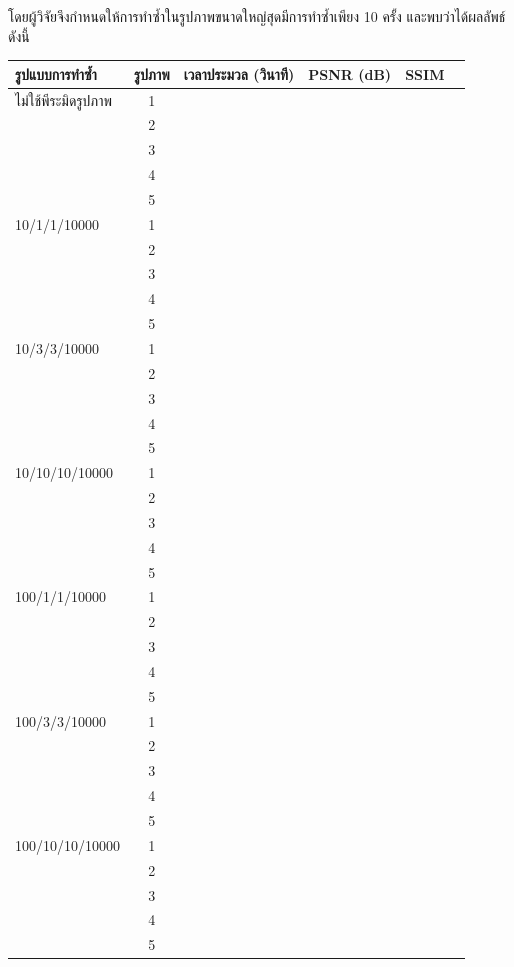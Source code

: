 \documentclass[hidelinks, a4paper,12pt]{article}
\numberwithin{equation}{section}							%
\numberwithin{equation}{section}
\begin{document}
{	 โดยผู้วิจัยจึงกำหนดให้การทำซ้ำในรูปภาพขนาดใหญ่สุดมีการทำซ้ำเพียง 10 ครั้ง และพบว่าได้ผลลัพธ์ดังนี้
		\begin{table}[H]
		\centering
		\begin{tabular}[ht]{|l|c|c|c|c|c|}
			\hline
			รูปแบบการทำซ้ำ  & รูปภาพ &เวลาประมวล  (วินาที) & PSNR (dB) & SSIM \\
			\hline
			ไม่ใช้พีระมิดรูปภาพ & 1 &  &  & \\ 
			& 2 &  &  & \\
			& 3 &  &  & \\
			& 4 &  &  & \\
			& 5 &  &  & \\
			\hline
			10/1/1/10000 & 1 &  & & \\
			& 2 &  & & \\
			& 3 &  & & \\
			& 4 &  & & \\
			& 5 &  & & \\
			\hline
			10/3/3/10000  & 1 &  & & \\
			& 2 &  & & \\
			& 3 &  & & \\
			& 4 &  & & \\
			& 5 &  & & \\
			\hline
			10/10/10/10000  & 1 &  & & \\
			& 2 &  & & \\
			& 3 &  & & \\
			& 4 &  & & \\
			& 5 &  & & \\
			\hline
			100/1/1/10000  & 1 &  & & \\
			& 2 &  & & \\
			& 3 &  & & \\
			& 4 &  & & \\
			& 5 &  & & \\
			\hline
			100/3/3/10000  & 1 &  & & \\
			& 2 &  & & \\
			& 3 &  & & \\
			& 4 &  & & \\
			& 5 &  & & \\
			\hline
			100/10/10/10000  & 1 &  & & \\
			& 2 &  & & \\
			& 3 &  & & \\
			& 4 &  & & \\
			& 5 &  & & \\
			\hline
		\end{tabular}

\end{table}}
\end{document}
